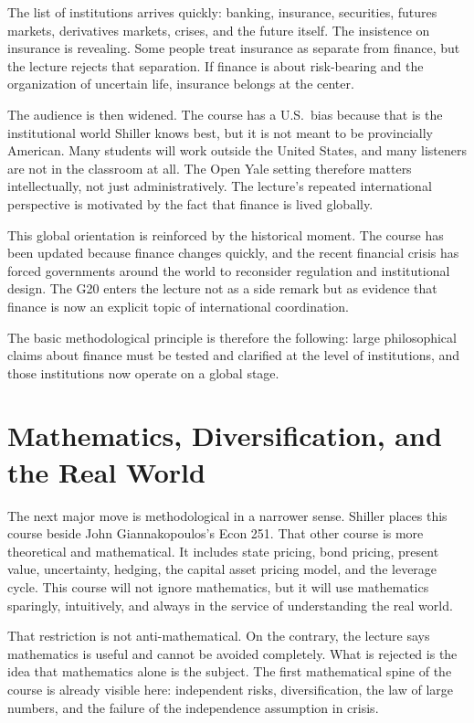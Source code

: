 The list of institutions arrives quickly: banking, insurance, securities, futures markets, derivatives markets, crises, and the future itself. The insistence on insurance is revealing. Some people treat insurance as separate from finance, but the lecture rejects that separation. If finance is about risk-bearing and the organization of uncertain life, insurance belongs at the center.

The audience is then widened. The course has a U.S.\ bias because that is the institutional world Shiller knows best, but it is not meant to be provincially American. Many students will work outside the United States, and many listeners are not in the classroom at all. The Open Yale setting therefore matters intellectually, not just administratively. The lecture's repeated international perspective is motivated by the fact that finance is lived globally.

This global orientation is reinforced by the historical moment. The course has been updated because finance changes quickly, and the recent financial crisis has forced governments around the world to reconsider regulation and institutional design. The G20 enters the lecture not as a side remark but as evidence that finance is now an explicit topic of international coordination.

The basic methodological principle is therefore the following: large philosophical claims about finance must be tested and clarified at the level of institutions, and those institutions now operate on a global stage.

\section{Mathematics, Diversification, and the Real World}

The next major move is methodological in a narrower sense. Shiller places this course beside John Giannakopoulos's Econ 251. That other course is more theoretical and mathematical. It includes state pricing, bond pricing, present value, uncertainty, hedging, the capital asset pricing model, and the leverage cycle. This course will not ignore mathematics, but it will use mathematics sparingly, intuitively, and always in the service of understanding the real world.

That restriction is not anti-mathematical. On the contrary, the lecture says mathematics is useful and cannot be avoided completely. What is rejected is the idea that mathematics alone is the subject. The first mathematical spine of the course is already visible here: independent risks, diversification, the law of large numbers, and the failure of the independence assumption in crisis.


